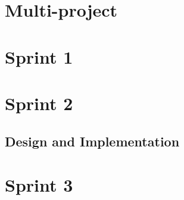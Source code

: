 \listoftodos
\chapter{Multi-project}



\chapter{Sprint 1}

\newpage




















\chapter{Sprint 2}


\newpage




\section{Design and Implementation}











\chapter{Sprint 3}





